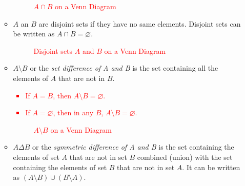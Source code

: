 \begin{itemize}
\begin{itemize}
	\begin{figure}[h]
	\centering
\caption{\textcolor{red}{$A \cap B$ on a Venn Diagram}}
	\end{figure}
	\item $A$ an $B$ are disjoint sets if they have no same elements. Disjoint sets can be written as $A \cap B=\varnothing$.
	\begin{figure}[h]
	\centering
\caption{\textcolor{red}{Disjoint sets $A$ and $B$ on a Venn Diagram}}
	\end{figure}
	\item $A \setminus B$ or the \textit{set difference of A and B} is the set containing all the elements of $A$ that are not in $B$.
	\textcolor{red}{
	\begin{itemize}
		\item If $A=B$, then $A \setminus B=\varnothing$.
		\item If $A=\varnothing$, then in any $B$, $A \setminus B=\varnothing$.
	\end{itemize}
	}
	\begin{figure}[h]
	\centering
\caption{\textcolor{red}{$A \setminus B$ on a Venn Diagram}}
	\end{figure}
	\item $A \Delta B$ or the \textit{symmetric difference of A and B} is  the set containing the elements of set $A$ that are not in set $B$ combined (union) with the set containing the elements of set $B$ that are not in set $A$. It can be written as $(A \setminus B) \cup (B \setminus A)$. 

\end{itemize}
\end{itemize}
